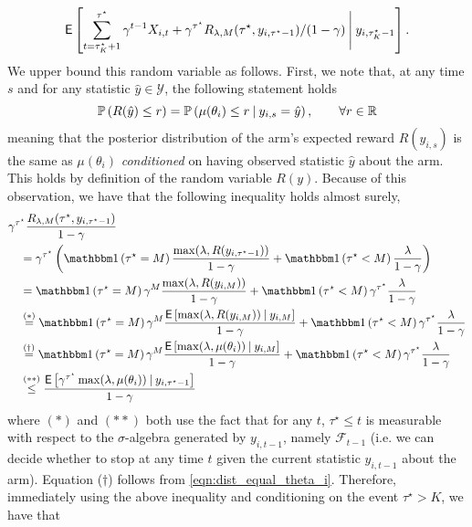 \begin{myproof}[Proof.]
	\[
		\E\left[\sum_{t=\tau_K^\star+1}^{\tau^\star}  \gamma^{t-1} X_{i,t} + \gamma^{\tau^\star} R_{\lambda,M}(\tau^\star, y_{i,\tau^\star-1})/(1-\gamma)
	\given[\Bigg] y_{i,\tau_K^\star-1} \right].
	\]
	We upper bound this random variable as follows. First, we note that, at any time $s$ and for any statistic $\hat y \in \mathcal{Y}$, the following statement holds
	\begin{equation}\label{eqn:dist_equal_theta_i}
	\P{R(\hat y) \le r} = \P{\mu(\theta_i) \le r \given y_{i,s} = \hat y}, \qquad \forall r \in \Re
	\end{equation}
	meaning that the posterior distribution of the arm's expected reward $R(y_{i,s})$ is the same as $\mu(\theta_i)$ \emph{conditioned} on having observed statistic $\hat y$ about the arm. This holds by definition of the random variable $R(y)$. Because of this observation, we have that the following inequality  holds almost surely,
	\begin{align*}
		& \gamma^{\tau^\star} \frac{R_{\lambda,M}(\tau^\star, y_{i,\tau^\star-1})}{1-\gamma}
		 \nonumber \\
		&\quad =  \gamma^{\tau^\star}\left( \ind{\tau^\star =M}\frac{\max(\lambda, R(y_{i,\tau^\star-1}))}{1-\gamma} + \ind{\tau^\star < M}\frac{\lambda}{1-\gamma}\right)
		 \nonumber\\
		&\quad= \ind{\tau^\star =M} \gamma^{M}\frac{\max(\lambda, R(y_{i,M}))}{1-\gamma} + \ind{\tau^\star < M} \gamma^{\tau^\star}\frac{\lambda}{1-\gamma}
	\nonumber\\
		& \quad\overset{(*)}{=} \ind{\tau^\star =M} \gamma^{M}\frac{\Ee{\max(\lambda, R(y_{i,M})) \given y_{i,M} }}{1-\gamma} + \ind{\tau^\star < M} \gamma^{\tau^\star}\frac{\lambda}{1-\gamma}
		\\
		& \quad\overset{(\dagger)}{=} \ind{\tau^\star =M} \gamma^{M}\frac{\Ee{\max(\lambda, \mu(\theta_i)) \given y_{i,M} }}{1-\gamma} + \ind{\tau^\star < M} \gamma^{\tau^\star}\frac{\lambda}{1-\gamma}
		 \\
		&\quad \overset{(**)}{\le} \frac{  \Ee{\gamma^{\tau^\star}\max(\lambda, \mu(\theta_i)) \given y_{i,\tau^\star-1} }}{1-\gamma}
	\end{align*}
	where $(*)$ and $(**)$ both use the fact that for any $t$, $\tau^\star \le t$ is measurable with respect to the $\sigma$-algebra generated by $y_{i,t-1}$, namely $\mathcal F_{t-1}$ (i.e. we can decide whether to stop at any time $t$ given the current statistic $y_{i,t-1}$ about the arm). Equation ($\dagger$) follows from \eqref{eqn:dist_equal_theta_i}. Therefore, immediately using the above inequality and conditioning on the event $\tau^\star > K$, we have that

\end{myproof}
